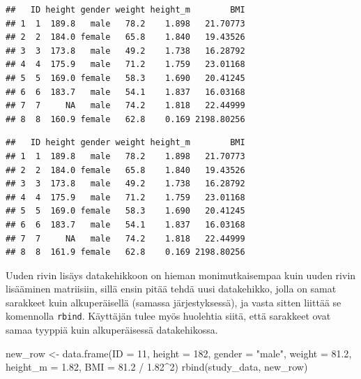 \documentclass[
]{book}
\newenvironment{Shaded}{\begin{snugshade}}{\end{snugshade}}
\newcommand{\AttributeTok}[1]{\textcolor[rgb]{0.77,0.63,0.00}{#1}}
\newcommand{\CommentTok}[1]{\textcolor[rgb]{0.56,0.35,0.01}{\textit{#1}}}
\newcommand{\DecValTok}[1]{\textcolor[rgb]{0.00,0.00,0.81}{#1}}
\newcommand{\FloatTok}[1]{\textcolor[rgb]{0.00,0.00,0.81}{#1}}
\newcommand{\FunctionTok}[1]{\textcolor[rgb]{0.00,0.00,0.00}{#1}}
\newcommand{\NormalTok}[1]{#1}
\newcommand{\OtherTok}[1]{\textcolor[rgb]{0.56,0.35,0.01}{#1}}
\newcommand{\SpecialCharTok}[1]{\textcolor[rgb]{0.00,0.00,0.00}{#1}}
\newcommand{\StringTok}[1]{\textcolor[rgb]{0.31,0.60,0.02}{#1}}
\begin{document}
\begin{verbatim}
##   ID height gender weight height_m        BMI
## 1  1  189.8   male   78.2    1.898   21.70773
## 2  2  184.0 female   65.8    1.840   19.43526
## 3  3  173.8   male   49.2    1.738   16.28792
## 4  4  175.9   male   71.2    1.759   23.01168
## 5  5  169.0 female   58.3    1.690   20.41245
## 6  6  183.7   male   54.1    1.837   16.03168
## 7  7     NA   male   74.2    1.818   22.44999
## 8  8  160.9 female   62.8    0.169 2198.80256
\end{verbatim}

\begin{Shaded}
\end{Shaded}

\begin{verbatim}
##   ID height gender weight height_m        BMI
## 1  1  189.8   male   78.2    1.898   21.70773
## 2  2  184.0 female   65.8    1.840   19.43526
## 3  3  173.8   male   49.2    1.738   16.28792
## 4  4  175.9   male   71.2    1.759   23.01168
## 5  5  169.0 female   58.3    1.690   20.41245
## 6  6  183.7   male   54.1    1.837   16.03168
## 7  7     NA   male   74.2    1.818   22.44999
## 8  8  161.9 female   62.8    0.169 2198.80256
\end{verbatim}

Uuden rivin lisäys datakehikkoon on hieman monimutkaisempaa kuin uuden rivin lisääminen matriisiin, sillä ensin pitää tehdä uusi datakehikko, jolla on samat sarakkeet kuin alkuperäisellä (samassa järjestyksessä), ja vasta sitten liittää se komennolla \texttt{rbind}. Käyttäjän tulee myös huolehtia siitä, että sarakkeet ovat samaa tyyppiä kuin alkuperäisessä datakehikossa.

\begin{Shaded}
\begin{Highlighting}[]
\NormalTok{new\_row }\OtherTok{\textless{}{-}} \FunctionTok{data.frame}\NormalTok{(}\AttributeTok{ID =} \DecValTok{11}\NormalTok{, }\AttributeTok{height =} \DecValTok{182}\NormalTok{, }\AttributeTok{gender =} \StringTok{"male"}\NormalTok{, }
                      \AttributeTok{weight =} \FloatTok{81.2}\NormalTok{, }\AttributeTok{height\_m =} \FloatTok{1.82}\NormalTok{, }\AttributeTok{BMI =} \FloatTok{81.2} \SpecialCharTok{/} \FloatTok{1.82}\SpecialCharTok{\^{}}\DecValTok{2}\NormalTok{)}
\FunctionTok{rbind}\NormalTok{(study\_data, new\_row)}
\end{Highlighting}
\end{Shaded}
\end{document}
